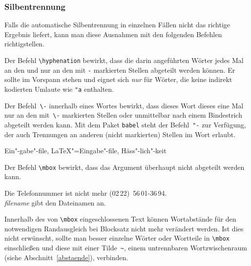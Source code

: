  
\subsubsection{Silbentrennung} \label{silb}
 
Falls die automatische Silbentrennung in einzelnen Fällen nicht
das richtige Ergebnis liefert, kann man diese Ausnahmen mit den
folgenden Befehlen richtigstellen.
 
Der Befehl \lstinline|\hyphenation| bewirkt, dass die darin
angeführten Wörter jedes Mal an den und nur an den mit
\lstinline|-| markierten Stellen abgeteilt werden können.
Er sollte im Vorspann stehen und eignet sich
\emph{nur} für Wörter, die keine indirekt kodierten Umlaute wie \lstinline|"a| enthalten.

\begin{example}
\end{example}

Der Befehl~\lstinline|\-| innerhalb eines Wortes bewirkt, dass dieses Wort
dieses eine Mal nur an den mit~\lstinline|\-| markierten Stellen  oder
unmittelbar nach einem Bindestrich abgeteilt werden kann. Mit dem Paket
\texttt{babel}\cite{babel} steht der Befehl~\lstinline:"-: zur
Verfügung, der auch Trennungen an anderen (nicht markierten) Stellen im Wort
erlaubt.

\begin{LTXexample}
Ein"-gabe"-file,
\LaTeX"=Eingabe"-file,
Häss"-lich"-keit
\end{LTXexample}

Der Befehl \lstinline|\mbox| bewirkt, dass das Argument überhaupt nicht
abgeteilt werden kann.

\begin{LTXexample}
Die Telefonnummer ist nicht mehr
\mbox{(02\,22) 56\,01-36\,94}. \\
\mbox{\textit{filename}} gibt den 
Dateinamen an.
\end{LTXexample}

Innerhalb des von \lstinline|\mbox| eingeschlossenen Text können
Wortabstände für den notwendigen Randausgleich bei
Blocksatz nicht mehr verändert werden.  Ist dies nicht
erwünscht, sollte man besser einzelne Wörter oder Wortteile
in \lstinline|\mbox| einschließen und diese mit einer Tilde~\lstinline|~|,
einem untrennbaren Wortzwischenraum (siehe
Abschnitt~\ref{abstaende}), verbinden.



